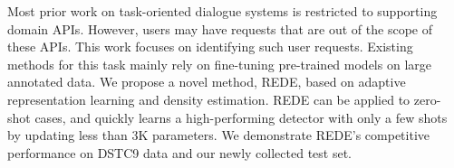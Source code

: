 Most prior work on task-oriented dialogue systems is restricted to  supporting domain APIs. However, users may have requests that are out of the scope of these APIs. This work focuses on identifying such user requests. Existing methods for this task mainly rely on fine-tuning pre-trained models on large annotated data. We propose a novel method, REDE, based on adaptive representation learning and density estimation. REDE can be applied to zero-shot cases, and quickly learns a high-performing detector with only a few shots by updating less than 3K parameters. We demonstrate REDE's competitive performance on DSTC9 data and our newly collected test set.
